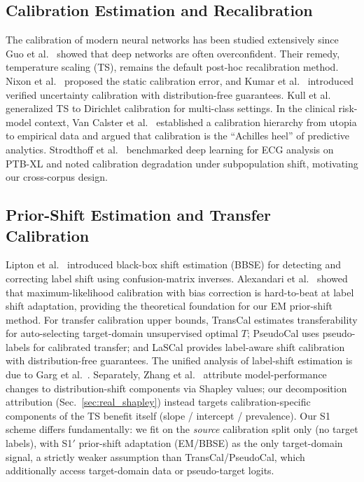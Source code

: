\documentclass[review,12pt,nonatbib]{elsarticle}
\begin{document}
\subsection{Calibration Estimation and Recalibration}
The calibration of modern neural networks has been studied extensively
since Guo et al.\ \cite{guo2017calibration} showed that deep networks are
often overconfident. Their remedy, temperature scaling (TS), remains the
default post-hoc recalibration method.
Nixon et al.\ \cite{nixon2019} proposed the static calibration error,
and Kumar et al.\ \cite{kumar2019} introduced verified uncertainty
calibration with distribution-free guarantees. Kull et al.\
\cite{kull2019dirichlet} generalized TS to Dirichlet calibration for
multi-class settings. In the clinical risk-model context, Van Calster
et al.\ \cite{vancalster2016,vancalster2019} established a calibration
hierarchy from utopia to empirical data and argued that calibration is
the ``Achilles heel'' of predictive analytics. Strodthoff et al.\
\cite{strodthoff2021} benchmarked deep learning for ECG analysis on
PTB-XL and noted calibration degradation under subpopulation shift,
motivating our cross-corpus design.

\subsection{Prior-Shift Estimation and Transfer Calibration}
Lipton et al.\ \cite{lipton2018bbs} introduced black-box shift
estimation (BBSE) for detecting and correcting label shift using
confusion-matrix inverses. Alexandari et al.\ \cite{alexandari2020}
showed that maximum-likelihood calibration with bias correction is
hard-to-beat at label shift adaptation, providing the theoretical
foundation for our EM prior-shift method. For transfer calibration
upper bounds, TransCal \cite{transcal2020} estimates transferability
for auto-selecting target-domain unsupervised optimal $T$; PseudoCal
\cite{pseudocal2024} uses pseudo-labels for calibrated transfer; and
LaSCal \cite{lascal2024} provides label-aware shift calibration with
distribution-free guarantees. The unified analysis of label-shift
estimation is due to Garg et al.\ \cite{garg2020labelshift}.
Separately, Zhang et al.\ \cite{zhang2023shapley} attribute
model-performance changes to distribution-shift components via
Shapley values; our decomposition attribution
(Sec.~\ref{sec:real_shapley}) instead targets calibration-specific
components of the TS benefit itself (slope / intercept / prevalence).
Our S1 scheme differs fundamentally: we fit on the \emph{source}
calibration split only (no target labels), with S1$'$ prior-shift
adaptation (EM/BBSE) as the only target-domain signal, a strictly
weaker assumption than TransCal/PseudoCal, which additionally access
target-domain data or pseudo-target logits.
\end{document}

